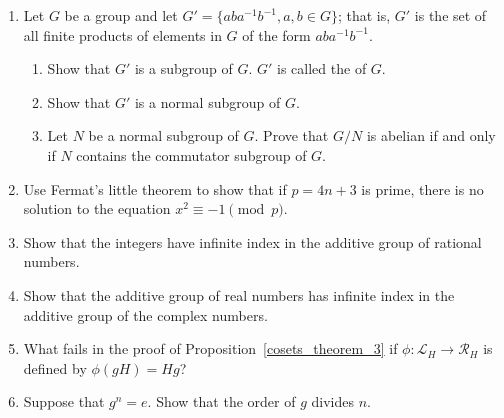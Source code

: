 {{\begin{enumerate}
\begin{enumerate}
 \item
Calculate the center of $S_3$.
 
 \item
Calculate the center of $GL_2 ( {\mathbb R} )$.
 
 \item
Show that the center of any group $G$ is a normal subgroup of $G$. 
 
 \item
If $G / Z(G)$ is cyclic, show that $G$ is abelian.
 
\end{enumerate}

\item
Let $G$ be a group and let $G' = \{ aba^{- 1} b^{-1}, a,b \in G \}$;
that is, $G'$ is the set of all finite products of elements in
$G$ of the form $aba^{-1}b^{-1}$.  
\begin{enumerate}
 \item
Show that $G'$ is a subgroup of $G$. $G'$ is called the
\label{commutatorsubgroup} of $G$.  
 \item
Show that $G'$ is a normal subgroup of $G$.

 \item
Let $N$ be  a normal subgroup of $G$.  Prove that $G/N$ is abelian if
and only if $N$ contains the commutator subgroup of $G$.
 
\end{enumerate}

\item
Use Fermat's little theorem to show that if $p= 4n+3$ is prime, there is no solution to the equation $x^2 \equiv -1 \pmod{p}$.
 
\item
Show that the integers have infinite index in the additive group of rational numbers.
 
\item
Show that the additive group of real numbers has infinite index in the additive group of the complex numbers.
 
 
\item
What fails in the proof of Proposition~\ref{cosets_theorem_3} if $\phi :  {\mathcal L}_H \rightarrow {\mathcal R}_H$ is defined by $\phi( gH ) = Hg$?
 
\item
Suppose that $g^n = e$. Show that the order of $g$ divides
$n$.
 


\end{enumerate}}}
